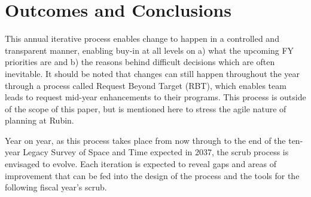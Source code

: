 \section{Outcomes and Conclusions} \label{sec:outcomes}

This annual iterative process enables change to happen in a controlled and transparent manner, enabling buy-in at all levels on a) what the upcoming FY priorities are and b) the reasons behind difficult decisions which are often inevitable. 
It should be noted that changes can still happen throughout the year through a process called Request Beyond Target (RBT), which enables team leads to request mid-year enhancements to their programs. 
This process is outside of the scope of this paper, but is mentioned here to stress the agile nature of planning at Rubin.

Year on year, as this process takes place from now through to the end of the ten-year Legacy Survey of Space and Time expected in 2037, the scrub process is envisaged to evolve.
Each iteration is expected to reveal gaps and areas of improvement that can be fed into the design of the process and the tools for the following fiscal year’s scrub.
